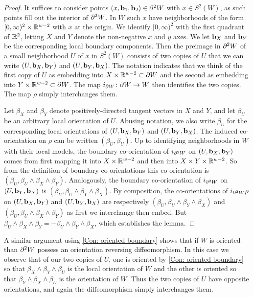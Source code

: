 \begin{proof}
	It suffices to consider points $(x,\mathbf{b}_1,\mathbf{b}_2) \in \partial^2 W$ with $x \in S^2(W)$, as such points fill out the interior of $\partial^2 W$.
	In $W$ such $x$ have neighborhoods of the form $[0,\infty)^2 \times \mathbb{R}^{w-2}$ with $x$ at the origin.
	We identify $[0,\infty)^2$ with the first quadrant of $\mathbb{R}^2$, letting $X$ and $Y$ denote the non-negative $x$ and $y$ axes.
	We let $\mathbf{b}_X$ and $\mathbf{b}_Y$ be the corresponding local boundary components.
	Then the preimage in $\partial^2 W$ of a small neighborhood $U$ of $x$ in $S^2(W)$ consists of two copies of $U$ that we can write $(U,\mathbf{b}_X,\mathbf{b}_Y)$ and $(U,\mathbf{b}_Y,\mathbf{b}_X)$.
	The notation indicates that we think of the first copy of $U$ as embedding into $X \times \mathbb{R}^{w-2} \subset \partial W$ and the second as embedding into $Y \times \mathbb{R}^{w-2} \subset \partial W$.
	The map $i_{\partial W} \colon \partial W \to W$ then identifies the two copies.
	The map $\rho$ simply interchanges them.

	Let $\beta_X$ and $\beta_Y$ denote positively-directed tangent vectors in $X$ and $Y$, and let $\beta_U$ be an arbitrary local orientation of $U$.
	Abusing notation, we also write $\beta_U$ for the corresponding local orientations of $(U,\mathbf{b}_X,\mathbf{b}_Y)$ and $(U,\mathbf{b}_Y,\mathbf{b}_X)$.
	The induced co-orientation on $\rho$ can be written $(\beta_U,\beta_U)$.
	Up to identifying neighborhoods in $W$ with their local models, the boundary co-orientation of $i_{\partial^2 W}$ on $(U,\mathbf{b}_X,\mathbf{b}_Y)$ comes from first mapping it into $X \times \mathbb{R}^{w-2}$ and then into $X \times Y \times \mathbb{R}^{w-2}$.
	So from the definition of boundary co-orientations this co-orientation is $(\beta_U, \beta_U \wedge \beta_X \wedge \beta_Y)$.
	Analogously, the boundary co-orientation of $i_{\partial^2 W}$ on $(U,\mathbf{b}_Y,\mathbf{b}_X)$ is $(\beta_U, \beta_U \wedge \beta_Y \wedge \beta_X)$.
	By composition, the co-orientations of $i_{\partial^2 W}\rho$ on $(U,\mathbf{b}_X,\mathbf{b}_Y)$ and $(U,\mathbf{b}_Y,\mathbf{b}_X)$ are respectively $(\beta_U, \beta_U \wedge \beta_Y \wedge \beta_X)$ and $(\beta_U, \beta_U \wedge \beta_X \wedge \beta_Y)$ as first we interchange then embed.
	But $\beta_U \wedge \beta_X \wedge \beta_Y = -\beta_U \wedge \beta_Y \wedge \beta_X$, which establishes the lemma.
\end{proof}

\begin{remark}\label{R: bd2 oriented}
	A similar argument using \cref{Con: oriented boundary} shows that if $W$ is oriented than $\partial^2 W$ possess an orientation reversing diffeomorphism.
	In this case we observe that of our two copies of $U$, one is oriented by \cref{Con: oriented boundary} so that $\beta_X \wedge \beta_Y \wedge \beta_U$ is the local orientation of $W$ and the other is oriented so that $\beta_Y \wedge \beta_X \wedge \beta_U$ is the orientation of $W$.
	Thus the two copies of $U$ have opposite orientations, and again the diffeomorphism simply interchanges them.
\end{remark}

